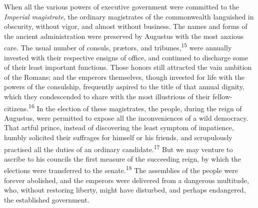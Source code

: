 When all the various powers of executive government were
committed to the \textit{Imperial magistrate}, the ordinary magistrates
of the commonwealth languished in obscurity, without vigor, and
almost without business. The names and forms of the ancient
administration were preserved by Augustus with the most anxious
care. The usual number of consuls, prætors, and tribunes,\textsuperscript{15} were
annually invested with their respective ensigns of office, and
continued to discharge some of their least important functions.
Those honors still attracted the vain ambition of the Romans; and
the emperors themselves, though invested for life with the powers
of the consulship, frequently aspired to the title of that annual
dignity, which they condescended to share with the most
illustrious of their fellow-citizens.\textsuperscript{16} In the election of these
magistrates, the people, during the reign of Augustus, were
permitted to expose all the inconveniences of a wild democracy.
That artful prince, instead of discovering the least symptom of
impatience, humbly solicited their suffrages for himself or his
friends, and scrupulously practised all the duties of an ordinary
candidate.\textsuperscript{17} But we may venture to ascribe to his councils the
first measure of the succeeding reign, by which the elections
were transferred to the senate.\textsuperscript{18} The assemblies of the people
were forever abolished, and the emperors were delivered from a
dangerous multitude, who, without restoring liberty, might have
disturbed, and perhaps endangered, the established government.



